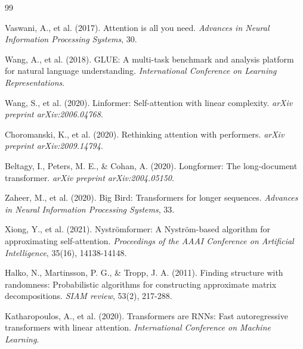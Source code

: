 \documentclass[twocolumn]{article}
\begin{document}

\begin{thebibliography}{99}

Vaswani, A., et al. (2017). Attention is all you need. \textit{Advances in Neural Information Processing Systems}, 30.

Wang, A., et al. (2018). GLUE: A multi-task benchmark and analysis platform for natural language understanding. \textit{International Conference on Learning Representations}.

Wang, S., et al. (2020). Linformer: Self-attention with linear complexity. \textit{arXiv preprint arXiv:2006.04768}.

Choromanski, K., et al. (2020). Rethinking attention with performers. \textit{arXiv preprint arXiv:2009.14794}.

Beltagy, I., Peters, M. E., \& Cohan, A. (2020). Longformer: The long-document transformer. \textit{arXiv preprint arXiv:2004.05150}.

Zaheer, M., et al. (2020). Big Bird: Transformers for longer sequences. \textit{Advances in Neural Information Processing Systems}, 33.

Xiong, Y., et al. (2021). Nyströmformer: A Nyström-based algorithm for approximating self-attention. \textit{Proceedings of the AAAI Conference on Artificial Intelligence}, 35(16), 14138-14148.

Halko, N., Martinsson, P. G., \& Tropp, J. A. (2011). Finding structure with randomness: Probabilistic algorithms for constructing approximate matrix decompositions. \textit{SIAM review}, 53(2), 217-288.

Katharopoulos, A., et al. (2020). Transformers are RNNs: Fast autoregressive transformers with linear attention. \textit{International Conference on Machine Learning}.

\end{thebibliography}
\end{document}
